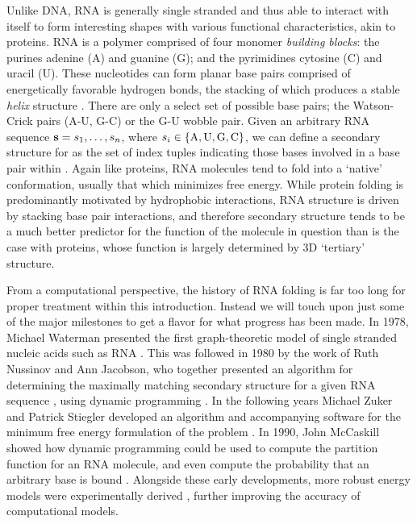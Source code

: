 Unlike DNA, RNA is generally single stranded and thus able to interact with itself
to form interesting shapes with various functional characteristics, akin to
proteins. RNA is a polymer comprised of four monomer {\em building blocks}:
the purines
adenine (A) and guanine (G); and the pyrimidines cytosine (C) and uracil (U). These
nucleotides can form planar base pairs comprised of energetically favorable
hydrogen bonds, the stacking of which produces a stable {\em helix} structure
\citep{yakovchuk:2006bm}. There are only a select set of possible base pairs; the
Watson-Crick pairs (A-U, G-C) or the G-U wobble pair. Given an arbitrary RNA
sequence ${\bf s} = s_1,\dots,s_n$, where $s_i \in \{\text{A,\,U,\,G,\,C}\}$, we can define
a secondary structure \str for \seq as the set of index tuples indicating those
bases involved in a base pair within \seq. Again like proteins, RNA molecules tend
to fold into a `native' conformation, usually that which minimizes free energy.
While protein folding is predominantly motivated by hydrophobic
interactions, RNA structure is driven by stacking base pair interactions, and
therefore secondary structure tends to be a much better predictor for the function
of the molecule in question than is the case with proteins, whose function is
largely determined by 3D `tertiary' structure.

From a computational perspective, the history of RNA folding is far too long for
proper treatment within this introduction. Instead we will touch upon just some
of the major milestones to get a flavor for what progress has been made. In 1978,
Michael Waterman presented the first graph-theoretic model of single stranded
nucleic acids such as RNA \citep{waterman:1978va}. This was followed in 1980 by
the work of Ruth Nussinov and Ann Jacobson, who together presented an algorithm for
determining the maximally matching secondary structure \str for
a given RNA sequence \citep{nussinov1980}, using dynamic programming
\citep{bellman:1952vza}. In the following years Michael Zuker and Patrick Stiegler
developed an algorithm and accompanying software for the minimum free energy
formulation of the problem \citep{zuker:1981tf,zuker:1989im}. In 1990, John
McCaskill showed how dynamic programming could be used to compute the
partition function for an RNA molecule, and even compute the probability that an
arbitrary base is bound \citep{mccaskill}. Alongside these early developments,
more robust energy models were experimentally derived \citep{turner,turner:2009vy},
further improving the accuracy of computational models.

